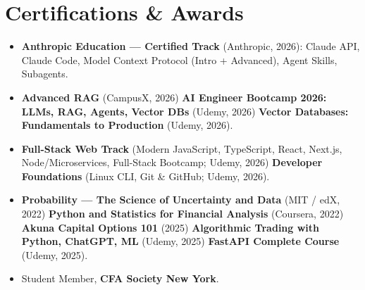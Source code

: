 \documentclass[10pt,letterpaper]{article}
\begin{document}
\section*{Certifications \& Awards}
\small
\begin{itemize}
  \item \textbf{Anthropic Education --- Certified Track} (Anthropic, 2026): Claude API, Claude Code, Model Context Protocol (Intro + Advanced), Agent Skills, Subagents.
  \item \textbf{Advanced RAG} (CampusX, 2026) \textperiodcentered{} \textbf{AI Engineer Bootcamp 2026: LLMs, RAG, Agents, Vector DBs} (Udemy, 2026) \textperiodcentered{} \textbf{Vector Databases: Fundamentals to Production} (Udemy, 2026).
  \item \textbf{Full-Stack Web Track} (Modern JavaScript, TypeScript, React, Next.js, Node/Microservices, Full-Stack Bootcamp; Udemy, 2026) \textperiodcentered{} \textbf{Developer Foundations} (Linux CLI, Git \& GitHub; Udemy, 2026).
  \item \textbf{Probability --- The Science of Uncertainty and Data} (MIT / edX, 2022) \textperiodcentered{} \textbf{Python and Statistics for Financial Analysis} (Coursera, 2022) \textperiodcentered{} \textbf{Akuna Capital Options 101} (2025) \textperiodcentered{} \textbf{Algorithmic Trading with Python, ChatGPT, ML} (Udemy, 2025) \textperiodcentered{} \textbf{FastAPI Complete Course} (Udemy, 2025).
  \item Student Member, \textbf{CFA Society New York}.
\end{itemize}
\end{document}
